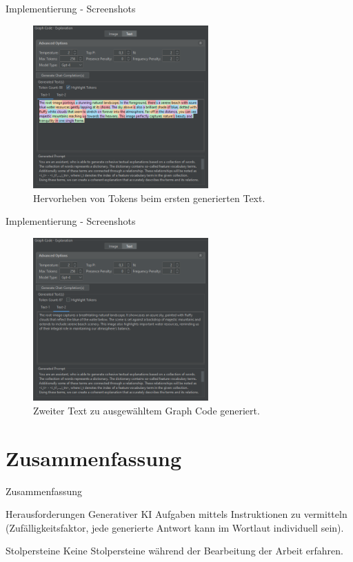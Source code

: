 \documentclass[t]{beamer}
\begin{document}
\begin{frame}{Implementierung - Screenshots}

  \begin{figure}
    \includegraphics[width=0.6\textwidth]{images/right_text_two_exps_1_high}
    \caption{Hervorheben von Tokens beim ersten generierten Text.}
  \end{figure}

\end{frame}

\begin{frame}{Implementierung - Screenshots}

  \begin{figure}
    \includegraphics[width=0.6\textwidth]{images/right_text_two_exps_2}
    \caption{Zweiter Text zu ausgewähltem Graph Code generiert.}
  \end{figure}

\end{frame}

\section{Zusammenfassung}

\begin{frame}{Zusammenfassung}

  \begin{block}{Herausforderungen}
    Generativer KI Aufgaben mittels Instruktionen zu vermitteln (Zufälligkeitsfaktor, jede generierte Antwort kann im Wortlaut individuell sein).
  \end{block}

  \begin{block}{Stolpersteine}
    Keine Stolpersteine während der Bearbeitung der Arbeit erfahren.
  \end{block}

\end{frame}
\end{document}
